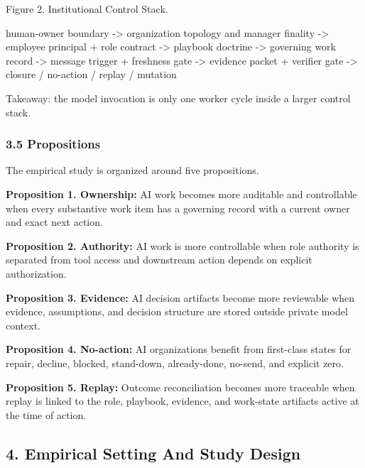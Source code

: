 \documentclass[
]{article}
\newenvironment{Shaded}{}{}
\newcommand{\NormalTok}[1]{#1}
\begin{document}
Figure 2. Institutional Control Stack.

\begin{Shaded}
\begin{Highlighting}[]
\NormalTok{human{-}owner boundary}
\NormalTok{  {-}\textgreater{} organization topology and manager finality}
\NormalTok{  {-}\textgreater{} employee principal + role contract}
\NormalTok{  {-}\textgreater{} playbook doctrine}
\NormalTok{  {-}\textgreater{} governing work record}
\NormalTok{  {-}\textgreater{} message trigger + freshness gate}
\NormalTok{  {-}\textgreater{} evidence packet + verifier gate}
\NormalTok{  {-}\textgreater{} closure / no{-}action / replay / mutation}
\end{Highlighting}
\end{Shaded}

Takeaway: the model invocation is only one worker cycle inside a larger control stack.

\subsubsection{3.5 Propositions}\label{propositions}

The empirical study is organized around five propositions.

\textbf{Proposition 1. Ownership:} AI work becomes more auditable and controllable when every substantive work item has a governing record with a current owner and exact next action.

\textbf{Proposition 2. Authority:} AI work is more controllable when role authority is separated from tool access and downstream action depends on explicit authorization.

\textbf{Proposition 3. Evidence:} AI decision artifacts become more reviewable when evidence, assumptions, and decision structure are stored outside private model context.

\textbf{Proposition 4. No-action:} AI organizations benefit from first-class states for repair, decline, blocked, stand-down, already-done, no-send, and explicit zero.

\textbf{Proposition 5. Replay:} Outcome reconciliation becomes more traceable when replay is linked to the role, playbook, evidence, and work-state artifacts active at the time of action.

\subsection{4. Empirical Setting And Study Design}\label{empirical-setting-and-study-design}
\end{document}
